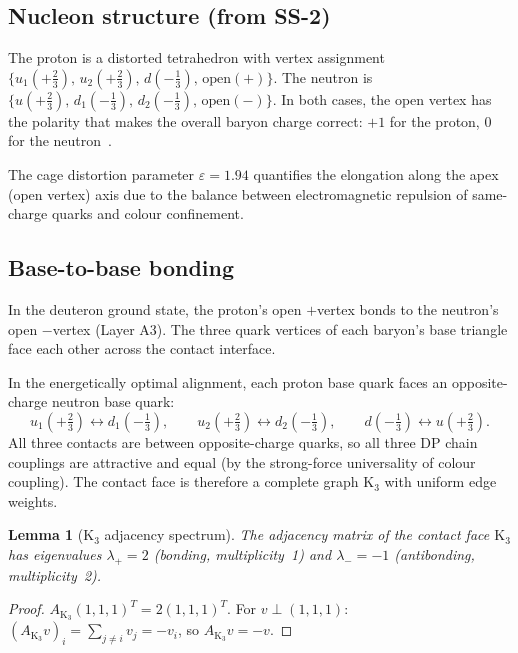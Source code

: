 \documentclass[11pt,letterpaper]{article}
\newtheorem{lemma}[theorem]{Lemma}
\newcommand{\Kthree}{\mathrm{K}_3}
\newcommand{\epscage}{\varepsilon}
\begin{document}
\subsection{Nucleon structure (from SS-2)}

The proton is a distorted tetrahedron with vertex assignment
$\{u_1(+\tfrac{2}{3}),\, u_2(+\tfrac{2}{3}),\,
d(-\tfrac{1}{3}),\, \text{open}(+)\}$.
The neutron is
$\{u(+\tfrac{2}{3}),\, d_1(-\tfrac{1}{3}),\,
d_2(-\tfrac{1}{3}),\, \text{open}(-)\}$.
In both cases, the open vertex has the polarity that
makes the overall baryon charge correct: $+1$ for the proton,
$0$ for the neutron~\citep{abshier2026ss2}.

The cage distortion parameter $\epscage = 1.94$ quantifies the
elongation along the apex (open vertex) axis due to the balance
between electromagnetic repulsion of same-charge quarks and
colour confinement.

\subsection{Base-to-base bonding}

In the deuteron ground state, the proton's open $+$vertex bonds
to the neutron's open $-$vertex (Layer A3).  The three quark
vertices of each baryon's base triangle face each other across
the contact interface.

In the energetically optimal alignment, each proton base quark
faces an opposite-charge neutron base quark:
\[
u_1(+\tfrac{2}{3}) \leftrightarrow d_1(-\tfrac{1}{3}),
\qquad
u_2(+\tfrac{2}{3}) \leftrightarrow d_2(-\tfrac{1}{3}),
\qquad
d(-\tfrac{1}{3}) \leftrightarrow u(+\tfrac{2}{3}).
\]
All three contacts are between opposite-charge quarks, so all
three DP chain couplings are attractive and equal (by the
strong-force universality of colour coupling).  The contact
face is therefore a complete graph $\Kthree$ with uniform
edge weights.

\begin{lemma}[$\Kthree$ adjacency spectrum]
\label{lem:K3spec}
The adjacency matrix of the contact face $\Kthree$ has
eigenvalues $\lambda_+ = 2$ (bonding, multiplicity~1) and
$\lambda_- = -1$ (antibonding, multiplicity~2).
\end{lemma}

\begin{proof}
$A_{\Kthree}(1,1,1)^T = 2(1,1,1)^T$.
For $v \perp (1,1,1)$:
$(A_{\Kthree}v)_i = \sum_{j \neq i} v_j = -v_i$,
so $A_{\Kthree}v = -v$.
\end{proof}
\end{document}
